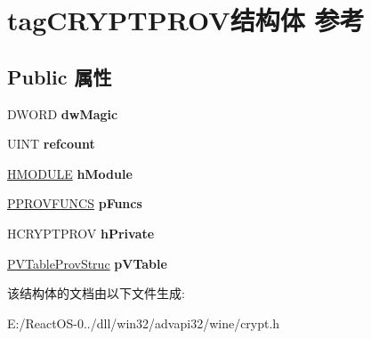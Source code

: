 \hypertarget{structtag_c_r_y_p_t_p_r_o_v}{}\section{tag\+C\+R\+Y\+P\+T\+P\+R\+O\+V结构体 参考}
\label{structtag_c_r_y_p_t_p_r_o_v}
\subsection*{Public 属性}
\begin{DoxyCompactItemize}
\item 
\mbox{\label{structtag_c_r_y_p_t_p_r_o_v_af29675056d3d20489fe9949296c4b90d}} 
D\+W\+O\+RD {\bfseries dw\+Magic}
\item 
\mbox{\label{structtag_c_r_y_p_t_p_r_o_v_ab7470389c2ca13e0929230dbeeb303e6}} 
U\+I\+NT {\bfseries refcount}
\item 
\mbox{\label{structtag_c_r_y_p_t_p_r_o_v_a0b756ff1752861a4e0679f242897ca65}} 
\hyperlink{interfacevoid}{H\+M\+O\+D\+U\+LE} {\bfseries h\+Module}
\item 
\mbox{\label{structtag_c_r_y_p_t_p_r_o_v_a4c122e6069e57c368374ea44bfb693ab}} 
\hyperlink{structtag_p_r_o_v_f_u_n_c_s}{P\+P\+R\+O\+V\+F\+U\+N\+CS} {\bfseries p\+Funcs}
\item 
\mbox{\label{structtag_c_r_y_p_t_p_r_o_v_a4e7e75631ba197fb625c169e0d6eb270}} 
H\+C\+R\+Y\+P\+T\+P\+R\+OV {\bfseries h\+Private}
\item 
\mbox{\label{structtag_c_r_y_p_t_p_r_o_v_a3977c82fa70f1af8b3e14e338cf0bd99}} 
\hyperlink{struct___v_table_prov_struc}{P\+V\+Table\+Prov\+Struc} {\bfseries p\+V\+Table}
\end{DoxyCompactItemize}


该结构体的文档由以下文件生成\+:\begin{DoxyCompactItemize}
\item 
E\+:/\+React\+O\+S-\/0../dll/win32/advapi32/wine/crypt.\+h\end{DoxyCompactItemize}
